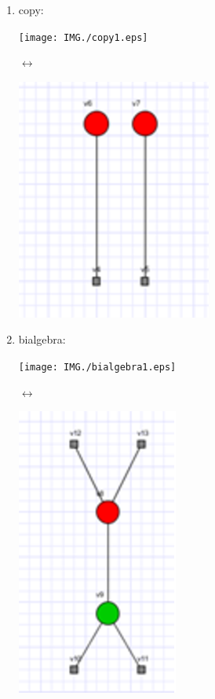 \documentclass[a4paper,oneside]{book}
\begin{document}
\begin{enumerate}
\item copy:\\
\begin{center}
\begin{minipage}[c]{0.25\textwidth}
\texttt{[image: IMG./copy1.eps]}
\end{minipage}
\hspace{0.5cm}\Huge{$\longleftrightarrow$}
\begin{minipage}[c]{0.25\textwidth}
\includegraphics[scale=1]{IMG/copy2.eps}
\end{minipage}
\label{copy}
\end{center}

\newpage

\item bialgebra:\\
\begin{center}
\begin{minipage}[c]{0.25\textwidth}
\texttt{[image: IMG./bialgebra1.eps]}
\end{minipage}
\hspace{0.5cm}\Huge{$\longleftrightarrow$}
\begin{minipage}[c]{0.25\textwidth}
\includegraphics[scale=1]{IMG/bialgebra2.eps}
\end{minipage}
\label{bialgebra}
\end{center}
\end{enumerate}
\end{document}
